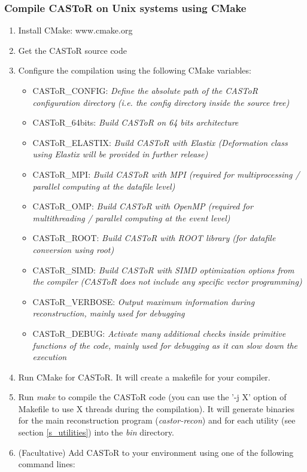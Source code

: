 \documentclass[a4paper, 11pt]{article}
\begin{document}
\subsubsection{Compile CASToR on Unix systems using CMake}
\label{sss_install_unix_cmake}

\begin{enumerate}
  \item Install CMake: www.cmake.org
  \item Get the CASToR source code
  \item Configure the compilation using the following CMake variables:
  \begin{itemize}
    \item CASToR\_CONFIG:  \textit{Define the absolute path of the CASToR configuration directory (\textit{i.e.} the \textit{config} directory inside the source tree)}
    \item CASToR\_64bits:  \textit{Build CASToR on 64 bits architecture}
    \item CASToR\_ELASTIX: \textit{Build CASToR with Elastix (Deformation class using Elastix will be provided in further release)}
    \item CASToR\_MPI:     \textit{Build CASToR with MPI (required for multiprocessing / parallel computing at the datafile level)}
    \item CASToR\_OMP:     \textit{Build CASToR with OpenMP (required for multithreading / parallel computing at the event level)}
    \item CASToR\_ROOT:    \textit{Build CASToR with ROOT library (for datafile conversion using root)}
    \item CASToR\_SIMD:    \textit{Build CASToR with SIMD optimization options from the compiler (CASToR does not include any specific vector programming)}
    \item CASToR\_VERBOSE: \textit{Output maximum information during reconstruction, mainly used for debugging}
    \item CASToR\_DEBUG:   \textit{Activate many additional checks inside primitive functions of the code, mainly used for debugging as it can slow down the execution}
  \end{itemize}
  \item Run CMake for CASToR. It will create a makefile for your compiler.
  \item Run \textit{make} to compile the CASToR code (you can use the '-j X' option of Makefile to use X threads during the compilation).
        It will generate binaries for the main reconstruction program (\textit{castor-recon}) and for each utility (see section \ref{s_utilities}) into the \textit{bin} directory.
  \item (Facultative) Add CASToR to your environment using one of the following command lines: 


\end{enumerate}
\end{document}
